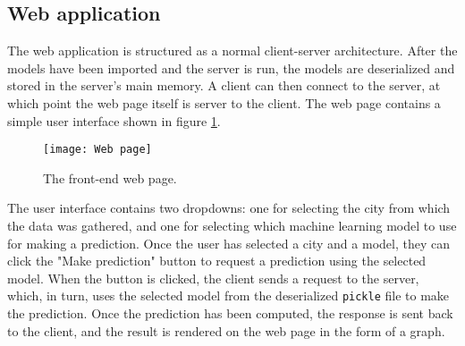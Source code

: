 \subsection{Web application}
The web application is structured as a normal client-server architecture. After the models have been imported and the server is run, the models are deserialized and stored in the server's main memory.
A client can then connect to the server, at which point the web page itself is server to the client.
The web page contains a simple user interface shown in figure \ref{fig:web page}.

\begin{figure}[h]
	\centering
	\texttt{[image: Web page]}
	\caption{The front-end web page.}
	\label{fig:web page}
\end{figure}

The user interface contains two dropdowns: one for selecting the city from which the data was gathered, and one for selecting which machine learning model to use for making a prediction.
Once the user has selected a city and a model, they can click the "Make prediction" button to request a prediction using the selected model.
When the button is clicked, the client sends a request to the server, which, in turn, uses the selected model from the deserialized \texttt{pickle} file to make the prediction. 
Once the prediction has been computed, the response is sent back to the client, and the result is rendered on the web page in the form of a graph.


